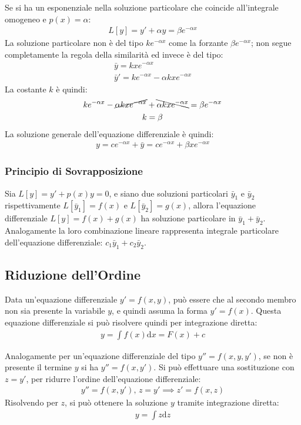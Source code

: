 \documentclass{article}
\newcommand{\df}{\mathrm{d}}
\numberwithin{equation}{subsection}
\begin{document}
Se si ha un esponenziale nella soluzione particolare che coincide all'integrale omogeneo e $p(x)=\alpha$:
\begin{gather}
    L[y]=y'+\alpha y=\beta e^{-\alpha x}
\end{gather}
La soluzione particolare non è del tipo $ke^{-\alpha x}$ come la forzante $\beta e^{-\alpha x}$; non segue completamente la regola della similarità ed invece è del tipo:
\begin{gather*}
    \bar{y}=kxe^{-\alpha x}\\
    \bar{y}'=ke^{-\alpha x}-\alpha kxe^{-\alpha x}
\end{gather*}
La costante $k$ è quindi:
\begin{gather*}
    ke^{-\alpha x}-\cancel{\alpha kxe^{-\alpha x}}+\bcancel{\alpha kxe^{-\alpha x}}=\beta e^{-\alpha x}\\
    k=\beta
\end{gather*}
La soluzione generale dell'equazione differenziale è quindi:
\begin{gather}
    y=ce^{-\alpha x}+\bar{y}=ce^{-\alpha x}+\beta xe^{-\alpha x}
\end{gather}

\subsubsection{Principio di Sovrapposizione}

Sia $L[y]=y'+p(x)y=0$, e siano due soluzioni particolari $\bar{y}_1$ e $\bar{y}_2$ rispettivamente $L[\bar{y}_1]=f(x)$ e $L[\bar{y}_2]=g(x)$, allora l'equazione differenziale $L[y]=f(x)+g(x)$ ha soluzione particolare in $\bar{y}_1+\bar{y}_2$. 
Analogamente la loro combinazione lineare rappresenta integrale particolare dell'equazione differenziale: $c_1\bar{y}_1+c_2\bar{y}_2$. 

\subsection{Riduzione dell'Ordine}

Data un'equazione differenziale $y'=f(x,y)$, può essere che al secondo membro non sia presente la variabile $y$, e quindi assuma la forma $y'=f(x)$. Questa equazione differenziale si può risolvere quindi per integrazione diretta:
\begin{gather*}
    y=\displaystyle\int f(x)\df x=F(x)+c
\end{gather*}

Analogamente per un'equazione differenziale del tipo $y''=f(x,y,y')$, se non è presente il termine $y$ si ha $y''=f(x,y')$. Si può effettuare una sostituzione con $z=y'$, per ridurre l'ordine dell'equazione differenziale:
\begin{gather}
    y''=f(x,y'),\,z=y'\implies z'=f(x,z)
\end{gather}
Risolvendo per $z$, si può ottenere la soluzione $y$ tramite integrazione diretta:
\begin{gather}
    y=\displaystyle\int z\df z
\end{gather}
\end{document}
